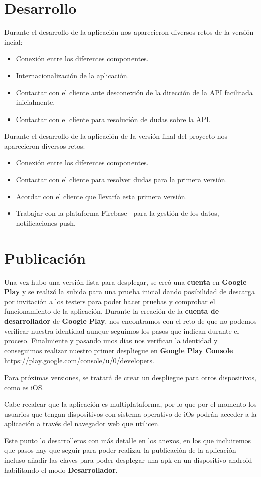 \section{Desarrollo}
Durante el desarrollo de la aplicación nos aparecieron diversos retos de la versión incial:
\begin{itemize}
\item Conexión entre los diferentes componentes.
\item Internacionalización de la aplicación.
\item Contactar con el cliente ante desconexión de la dirección de la API facilitada inicialmente.
\item Contactar con el cliente para resolución de dudas sobre la API.
\end{itemize}

Durante el desarrollo de la aplicación de la versión final del proyecto nos aparecieron diversos retos:
\begin{itemize}
\item Conexión entre los diferentes componentes.
\item Contactar con el cliente para resolver dudas para la primera versión.
\item Acordar con el cliente que llevaría esta primera versión.
\item Trabajar con la plataforma Firebase~\cite{firebase} para la gestión de los datos, notificaciones push.
\end{itemize}

\section{Publicación}
Una vez hubo una versión lista para desplegar, se creó una \textbf{cuenta} en \textbf{Google Play} y se realizó la subida para una prueba inicial dando posibilidad de descarga por invitación a los testers para poder hacer pruebas y comprobar el funcionamiento de la aplicación.
Durante la creación de la \textbf{cuenta de desarrollador} de \textbf{Google Play}, nos encontramos con el reto de que no podemos verificar nuestra identidad aunque seguimos los pasos que indican durante el proceso. Finalmiente y pasando unos días nos verifican la identidad y conseguimos realizar nuestro primer despliegue en \textbf{Google Play Console} \url{https://play.google.com/console/u/0/developers}.

Para próximas versiones, se tratará de crear un despliegue para otros dispositivos, como es iOS. 

Cabe recalcar que la aplicación es multiplataforma, por lo que por el momento los usuarios que tengan dispositivos con sistema operativo de iOs podrán acceder a la aplicación a través del navegador web que utilicen.

Este punto lo desarrolleros con más detalle en los anexos, en los que incluiremos que pasos hay que seguir para poder realizar la publicación de la aplicación incluso añadir las claves para poder desplegar una apk en un dispositivo android habilitando el modo \textbf{Desarrollador}.



